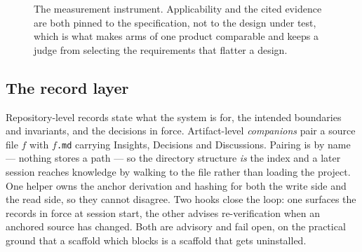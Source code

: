 \documentclass[11pt]{article}
\begin{document}
\begin{figure}[t]
\centering
{}
\caption{The measurement instrument. Applicability and the cited evidence are both pinned to the specification, not to the design under test, which is what makes arms of one product comparable and keeps a judge from selecting the requirements that flatter a design.}
\label{fig:instrument}
\end{figure}

\subsection{The record layer}
Repository-level records state what the system is for, the intended boundaries and invariants, and the decisions in force. Artifact-level \emph{companions} pair a source file $f$ with $f$\texttt{.md} carrying Insights, Decisions and Discussions. Pairing is by name --- nothing stores a path --- so the directory structure \emph{is} the index and a later session reaches knowledge by walking to the file rather than loading the project. One helper owns the anchor derivation and hashing for both the write side and the read side, so they cannot disagree. Two hooks close the loop: one surfaces the records in force at session start, the other advises re-verification when an anchored source has changed. Both are advisory and fail open, on the practical ground that a scaffold which blocks is a scaffold that gets uninstalled.
\end{document}
